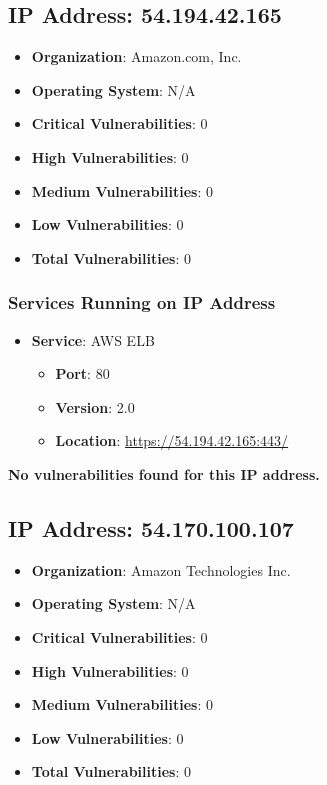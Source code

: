 \documentclass{article}
\begin{document}
\subsection{IP Address: 54.194.42.165}

\begin{itemize}
    \item \textbf{Organization}: Amazon.com, Inc.
    \item \textbf{Operating System}:  N/A 
    \item \textbf{Critical Vulnerabilities}: 0
    \item \textbf{High Vulnerabilities}: 0
    \item \textbf{Medium Vulnerabilities}: 0
    \item \textbf{Low Vulnerabilities}: 0
    \item \textbf{Total Vulnerabilities}: 0
\end{itemize}

\subsubsection*{Services Running on IP Address}

\begin{itemize}
    
        \item \textbf{Service}: AWS ELB
        \begin{itemize}
            \item \textbf{Port}: 80
            \item \textbf{Version}:  2.0 
            \item \textbf{Location}: \href{ https://54.194.42.165:443/ }{ https://54.194.42.165:443/ }
        \end{itemize}
    
\end{itemize}


\textbf{No vulnerabilities found for this IP address.}




\clearpage



\subsection{IP Address: 54.170.100.107}

\begin{itemize}
    \item \textbf{Organization}: Amazon Technologies Inc.
    \item \textbf{Operating System}:  N/A 
    \item \textbf{Critical Vulnerabilities}: 0
    \item \textbf{High Vulnerabilities}: 0
    \item \textbf{Medium Vulnerabilities}: 0
    \item \textbf{Low Vulnerabilities}: 0
    \item \textbf{Total Vulnerabilities}: 0
\end{itemize}
\end{document}
